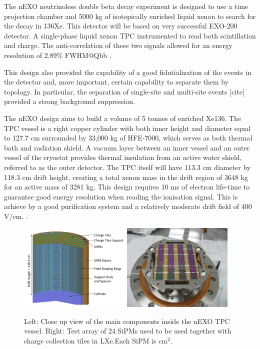 The nEXO neutrinoless double beta decay experiment is designed to use a time projection chamber and 5000 kg of isotopically enriched liquid xenon to search for the decay in 136Xe. This detector will be based on very successful EXO-200 detector. A single-phase liquid xenon TPC instrumented to read both scintillation and charge. The anti-correlation of these two signals allowed for an energy resolution of 2.89\% FWHM@Qbb \cite{EXO-200:2020wmu}.

This design also provided the capability of a good fidutialization of the events in the detector and, more important, certain capability to separate them by topology. In particular, the separation of single-site and multi-site events [cite] provided a strong background suppression.

The nEXO design aims to build a volume of 5 tonnes of enriched Xe136. The TPC vessel is a right copper cylinder with both inner height and diameter equal to 127.7 cm surrounded by 33,000 kg of HFE-7000, which serves as both thermal bath and radiation shield. A vacuum layer between an inner vessel and an outer vessel of the cryostat provides thermal insulation from an active water shield, referred to as the outer detector. The TPC itself will have 113.3 cm diameter by 118.3 cm drift height, creating a total xenon mass in the drift region of 3648 kg for an active mass of 3281 kg. This design requires 10 ms of electron life-time to guarantee good energy resolution when reading the ionisation signal. This is achieve by a good purification system and a relatively moderate drift field of 400 V/cm. \cite{nEXO:2021ujk}.



\begin{figure}[t!]
\begin{center}
\includegraphics[width=0.475\textwidth]{img/nexo_design}
\includegraphics[width=0.475\textwidth]{img/nexo_sipms}
\end{center}
\caption{Left: Close up view of the main components inside the nEXO TPC vessel. Right: Test array of 24 SiPMs used to be used together with charge collection tiles in LXe.Each SiPM is cm$^2$.} \label{fig:nexo}
\end{figure}

